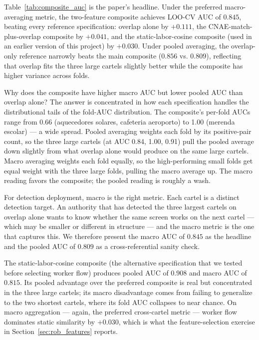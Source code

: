 Table~\ref{tab:composite_auc} is the paper's headline. Under the preferred macro-averaging metric, the two-feature composite achieves LOO-CV AUC of $\mathbf{0.845}$, beating every reference specification: overlap alone by $+0.111$, the CNAE-match-plus-overlap composite by $+0.041$, and the static-labor-cosine composite (used in an earlier version of this project) by $+0.030$. Under pooled averaging, the overlap-only reference narrowly beats the main composite ($0.856$ vs. $0.809$), reflecting that overlap fits the three large cartels slightly better while the composite has higher variance across folds.

Why does the composite have higher macro AUC but lower pooled AUC than overlap alone? The answer is concentrated in how each specification handles the distributional tails of the fold-AUC distribution. The composite's per-fold AUCs range from 0.66 (aquecedores solares, cafeteria aeroporto) to 1.00 (merenda escolar) --- a wide spread. Pooled averaging weights each fold by its positive-pair count, so the three large cartels (at AUC 0.84, 1.00, 0.91) pull the pooled average down slightly from what overlap alone would produce on the same large cartels. Macro averaging weights each fold equally, so the high-performing small folds get equal weight with the three large folds, pulling the macro average up. The macro reading favors the composite; the pooled reading is roughly a wash.

For detection deployment, macro is the right metric. Each cartel is a distinct detection target. An authority that has detected the three largest cartels on overlap alone wants to know whether the same screen works on the next cartel --- which may be smaller or different in structure --- and the macro metric is the one that captures this. We therefore present the macro AUC of $0.845$ as the headline and the pooled AUC of $0.809$ as a cross-referential sanity check.

The static-labor-cosine composite (the alternative specification that we tested before selecting worker flow) produces pooled AUC of $0.908$ and macro AUC of $0.815$. Its pooled advantage over the preferred composite is real but concentrated in the three large cartels; its macro disadvantage comes from failing to generalize to the two shortest cartels, where its fold AUC collapses to near chance. On macro aggregation --- again, the preferred cross-cartel metric --- worker flow dominates static similarity by $+0.030$, which is what the feature-selection exercise in Section~\ref{sec:rob_features} reports.

